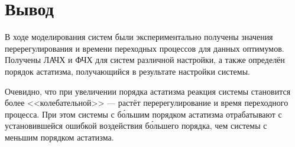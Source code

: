     \section{Вывод}
        В ходе моделирования систем были экспериментально получены значения перерегулирования и времени переходных процессов для данных оптимумов. Получены ЛАЧХ и ФЧХ для систем различной настройки, а также определён порядок астатизма, получающийся в результате настройки системы.

        Очевидно, что при увеличении порядка астатизма реакция системы становится более <<колебательной>> --- растёт перерегулирование и время переходного процесса. При этом системы с б\'{о}льшим порядком астатизма отрабатывают с установившейся ошибкой воздействия б\'{о}льшего порядка, чем системы с меньшим порядком астатизма.

